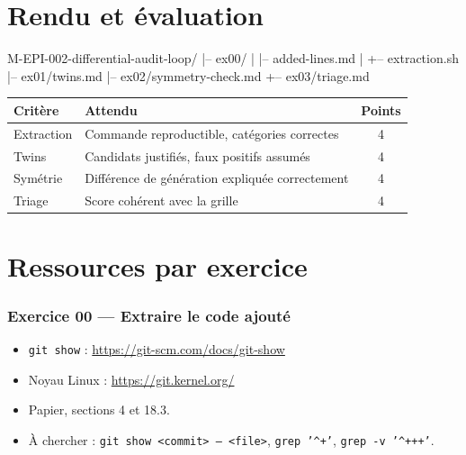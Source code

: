\documentclass{training}
\begin{document}
\chapter{Rendu et évaluation}

\begin{console}
M-EPI-002-differential-audit-loop/
|-- ex00/
|   |-- added-lines.md
|   +-- extraction.sh
|-- ex01/twins.md
|-- ex02/symmetry-check.md
+-- ex03/triage.md
\end{console}

\begin{center}
\begin{tabularx}{\linewidth}{|l|X|c|}
\hline
\textbf{Critère} & \textbf{Attendu} & \textbf{Points} \\ \hline
Extraction & Commande reproductible, catégories correctes & 4 \\ \hline
Twins & Candidats justifiés, faux positifs assumés & 4 \\ \hline
Symétrie & Différence de génération expliquée correctement & 4 \\ \hline
Triage & Score cohérent avec la grille & 4 \\ \hline
\end{tabularx}
\end{center}

\chapter{Ressources par exercice}

\subsection*{Exercice 00 --- Extraire le code ajouté}
\begin{itemize}
  \item \texttt{git show} : \url{https://git-scm.com/docs/git-show}
  \item Noyau Linux : \url{https://git.kernel.org/}
  \item Papier, sections 4 et 18.3.
  \item À chercher : \texttt{git show <commit> -- <file>},
        \texttt{grep '\string^+'}, \texttt{grep -v '\string^+++'}.
\end{itemize}
\end{document}
